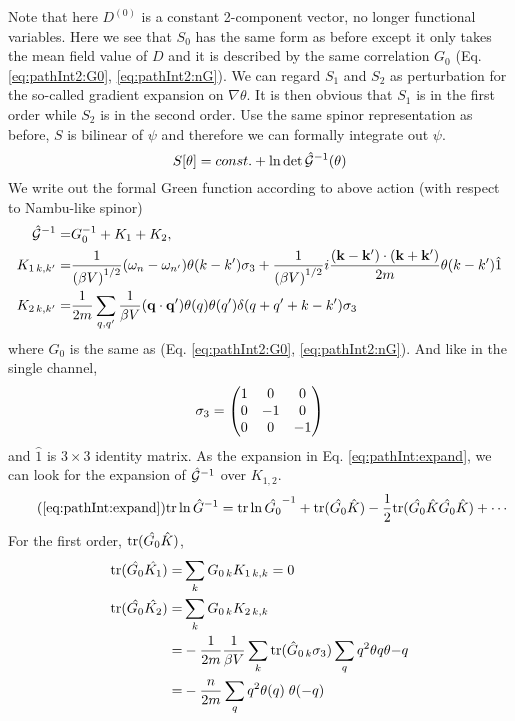 Note that here $D^{(0)}$ is a constant 2-component vector, no longer functional variables.  Here we see that $S_{0}$ has the same form as before except it only takes the mean field value of $D$ and it is described by the same correlation $G_{0}$ (Eq. \eqref{eq:pathInt2:G0}, \eqref{eq:pathInt2:nG}).  We can regard $S_{1}$ and $S_{2}$ as perturbation for the so-called gradient expansion on $\nabla\theta$.  It is then obvious that $S_{1}$ is in the first order while $S_{2}$ is in the second order.  Use the same spinor representation as before, $S$ is bilinear of $\psi$ and therefore we can formally integrate out $\psi$. 
\begin{equation}
S[\theta]=const.+\ln\det\hat{\mathcal{G}}^{-1}(\theta)
\end{equation}
 We write out the formal Green function according to above action (with respect to Nambu-like spinor)
\begin{subequations}
\begin{align}
\hat{\mathcal{G}}^{-1}=&G_{0}^{-1}+K_{1}+K_{2},\\
K_{1\, k,k'}=
	&\frac{1}{({\beta{}V)}^{1/2}}(\omega_n-\omega_{n'})\theta(k-k')\sigma_3+
		\frac{1}{{(\beta{}V)}^{1/2}}i\frac{(\mathbf{k}-\mathbf{k}')\cdot(\mathbf{k}+\mathbf{k}')}{2m}\theta(k-k')\hat{1}\\
K_{2\, k,k'}=
	&\frac{1}{2m}\sum_{q,q'}\frac{1}{{\beta{}V}}(\mathbf{q}\cdot\mathbf{q}')\theta(q)\theta(q')\delta(q+q'+k-k')\sigma_3
\end{align}
\end{subequations}
where $G_{0}$ is the same as (Eq. \eqref{eq:pathInt2:G0}, \eqref{eq:pathInt2:nG}).  And like in the single channel, 
\begin{equation}
\sigma_3=\begin{pmatrix}1&0&0\\0&-1&0\\0&0&-1\end{pmatrix}
\end{equation}
and $\hat{1}$ is $3\times3$ identity matrix.  As the expansion in Eq. \ref{eq:pathInt:expand}, we can look for the expansion of $\hat{\mathcal{G}}^{-1}$ over $K_{1,2}$.  
\begin{equation}\tag{\ref{eq:pathInt:expand}}
\tr\ln \hat{G}^{-1}=\tr\ln\hat{G_{0}}^{-1}+\tr(\hat{G_{0}}\hat{K})-\nth{2}\tr(\hat{G_{0}}\hat{K}\hat{G_{0}}\hat{K})+\cdots
\end{equation}
For the first order, $\text{tr}(\hat{G_{0}}\hat{K})$, 
\begin{align}
\text{tr}(\hat{G_{0}}\hat{K_1})=&\sum_{k}{G_{0\,k}K_{1\,k,k}}=0\\
\text{tr}(\hat{G_{0}}\hat{K_2})=&\sum_{k}{G_{0\,k}K_{2\,k,k}}\nonumber\\
	=&-\frac{1}{2m}\frac{1}{{\beta{}V}}\sum_{k}\text{tr}(\hat{G}_{0\,k}\sigma_3)\sum_{q}q^2\theta{q}\theta{-q}\nonumber\\
	=&-\frac{n}{2m}\sum_{q}q^2\theta{(q)}\;\theta{(-q)}
\end{align}
